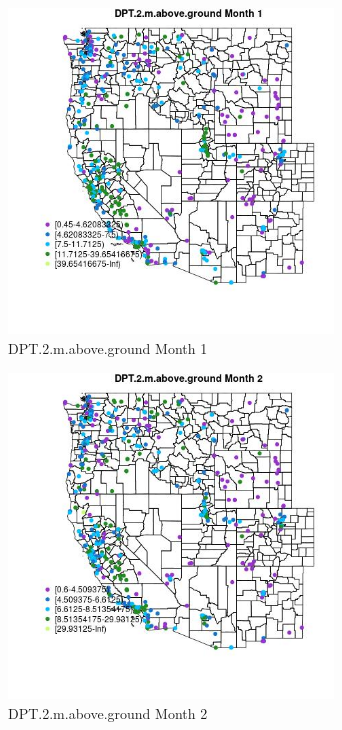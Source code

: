 \begin{figure} 
\centering  
\includegraphics[width=0.77\textwidth]{Code_Outputs/ML_input_report_ML_input_PM25_Step5_part_d_de_duplicated_aves_ML_input_MapObsMo1DPT2maboveground.jpg} 
\caption{\label{fig:ML_input_report_ML_input_PM25_Step5_part_d_de_duplicated_aves_ML_inputMapObsMo1DPT2maboveground}DPT.2.m.above.ground Month 1} 
\end{figure} 
 

\begin{figure} 
\centering  
\includegraphics[width=0.77\textwidth]{Code_Outputs/ML_input_report_ML_input_PM25_Step5_part_d_de_duplicated_aves_ML_input_MapObsMo2DPT2maboveground.jpg} 
\caption{\label{fig:ML_input_report_ML_input_PM25_Step5_part_d_de_duplicated_aves_ML_inputMapObsMo2DPT2maboveground}DPT.2.m.above.ground Month 2} 
\end{figure} 
 

